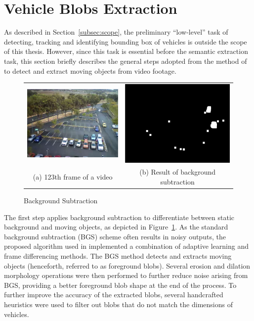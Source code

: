 \section{Vehicle Blobs Extraction}
\label{subsection:fundamental}

As described in Section~\ref{subsec:scope}, the preliminary ``low-level'' task of detecting, tracking and identifying bounding box of vehicles is outside the scope of this thesis. However, since this task is essential before the semantic extraction task, this section briefly describes the general steps adopted from the method of \cite{lim2017} to detect and extract moving objects from video footage. 
\begin{figure}[htb!]
  \centering
  \begin{tabular}{cc}
  \includegraphics[width=0.4\linewidth]{image/general/bgs1.png} &
  \includegraphics[width=0.4\linewidth]{image/general/bgs2.png}  \\
  (a) 123th frame of a video & (b) Result of background subtraction \\
  \end{tabular}
  \caption{Background Subtraction}
  \label{fig:bgs}
\end{figure}

The first step applies background subtraction to differentiate between static background and moving objects, as depicted in Figure~\ref{fig:bgs}. As the standard background subtraction (BGS) scheme often results in noisy outputs, the proposed algorithm used in \cite{lim2017} implemented a combination of adaptive learning and frame differencing methods. The BGS method detects and extracts moving objects (henceforth, referred to as foreground blobs).
Several erosion and dilation morphology operations were then performed to further reduce noise arising from BGS, providing a better foreground blob shape at the end of the process.
To further improve the accuracy of the extracted blobs, several handcrafted heuristics were used to filter out blobs that do not match the dimensions of vehicles.

